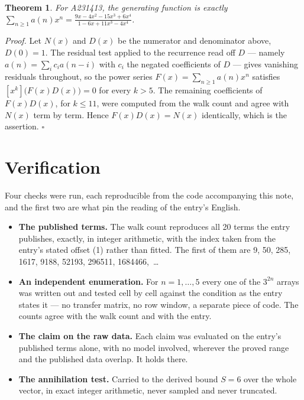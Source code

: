 \documentclass[11pt]{article}
\newtheorem{theorem}{Theorem}
\theoremstyle{definition}
\begin{document}
\begin{theorem} For A231413, the generating function is exactly $\sum_{n\ge 1} a(n)x^n = \frac{9x - 4x^{2} - 15x^{3} + 6x^{4}}{1 - 6x + 11x^{3} - 4x^{4}}$.\end{theorem}

{\itshape Proof.} Let $N(x)$ and $D(x)$ be the numerator and denominator above, $D(0)=1$. The residual test applied to the recurrence read off $D$ --- namely $a(n) = \sum_i c_i a(n-i)$ with $c_i$ the negated coefficients of $D$ --- gives vanishing residuals throughout, so the power series $F(x)=\sum_{n\ge 1}a(n)x^n$ satisfies $[x^k]\bigl(F(x)D(x)\bigr) = 0$ for every $k > 5$. The remaining coefficients of $F(x)D(x)$, for $k \le 11$, were computed from the walk count and agree with $N(x)$ term by term. Hence $F(x)D(x) = N(x)$ identically, which is the assertion. $\square$

\section{Verification}

Four checks were run, each reproducible from the code accompanying this note, and the first two are what pin the reading of the entry's English.

\begin{itemize}

\item {\bfseries The published terms.} The walk count reproduces all 20 terms the entry publishes, exactly, in integer arithmetic, with the index taken from the entry's stated offset (1) rather than fitted. The first of them are 9, 50, 285, 1617, 9188, 52193, 296511, 1684466,~\dots

\item {\bfseries An independent enumeration.} For $n = 1,\dots,5$ every one of the $3^{2n}$ arrays was written out and tested cell by cell against the condition as the entry states it --- no transfer matrix, no row window, a separate piece of code. The counts agree with the walk count and with the entry.

\item {\bfseries The claim on the raw data.} Each claim was evaluated on the entry's published terms alone, with no model involved, wherever the proved range and the published data overlap. It holds there.

\item {\bfseries The annihilation test.} Carried to the derived bound $S = 6$ over the whole vector, in exact integer arithmetic, never sampled and never truncated.

\end{itemize}
\end{document}
